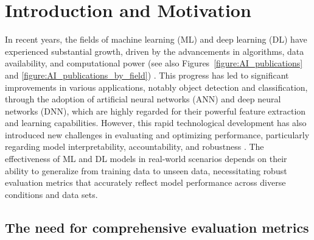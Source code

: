 \documentclass{article}
\begin{document}
\clearpage




\renewcommand{\contentsname}{Table of Contents}

\tableofcontents




\clearpage




\section{Introduction and Motivation}

In recent years, the fields of machine learning (ML) and deep learning (DL) have experienced substantial growth, driven by the advancements in algorithms, data availability, and computational power (see also Figures~\ref{figure:AI_publications} and \ref{figure:AI_publications_by_field}) \cite{krizhevsky2012imagenet, lecun2015deep, schmidhuber2015deep, szegedy2015going, goodfellow2016deep, bronstein2017geometric, sejnowski2018deep, liu2021survey, zaidi2022survey}. This progress has led to significant improvements in various applications, notably object detection and classification, through the adoption of artificial neural networks (ANN) and deep neural networks (DNN), which are highly regarded for their powerful feature extraction and learning capabilities. However, this rapid technological development has also introduced new challenges in evaluating and optimizing performance, particularly regarding model interpretability, accountability, and robustness \cite{doshi2017towards, samek2017explainable, gilpin2018explaining, carvalho2019machine, zhou2021evaluating, cooper2022accountability}. The effectiveness of ML and DL models in real-world scenarios depends on their ability to generalize from training data to unseen data, necessitating robust evaluation metrics that accurately reflect model performance across diverse conditions and data sets.


\subsection{The need for comprehensive evaluation metrics}
\end{document}
